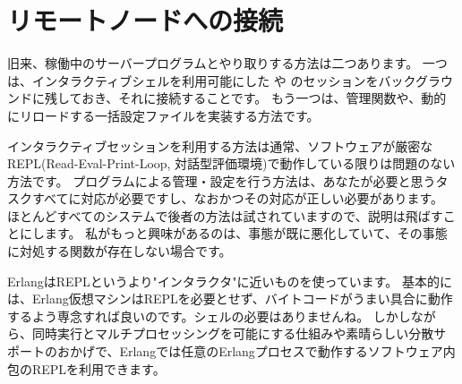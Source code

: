 \chapter{リモートノードへの接続}
\label{chap:connecting}

旧来、稼働中のサーバープログラムとやり取りする方法は二つあります。
一つは、インタラクティブシェルを利用可能にした や  のセッションをバックグラウンドに残しておき、それに接続することです。
もう一つは、管理関数や、動的にリロードする一括設定ファイルを実装する方法です。

インタラクティブセッションを利用する方法は通常、ソフトウェアが厳密なREPL(Read-Eval-Print-Loop, 対話型評価環境)で動作している限りは問題のない方法です。
プログラムによる管理・設定を行う方法は、あなたが必要と思うタスクすべてに対応が必要ですし、なおかつその対応が正しい必要があります。 %
ほとんどすべてのシステムで後者の方法は試されていますので、説明は飛ばすことにします。
私がもっと興味があるのは、事態が既に悪化していて、その事態に対処する関数が存在しない場合です。

ErlangはREPLというより"インタラクタ"に近いものを使っています。
基本的には、Erlang仮想マシンはREPLを必要とせず、バイトコードがうまい具合に動作するよう専念すれば良いのです。シェルの必要はありませんね。
しかしながら、同時実行とマルチプロセッシングを可能にする仕組みや素晴らしい分散サポートのおかげで、Erlangでは任意のErlangプロセスで動作するソフトウェア内包のREPLを利用できます。

